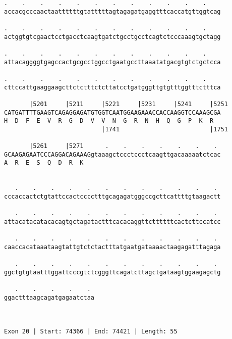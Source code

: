 \documentclass{article}
\begin{document}
\begin{Verbatim}
.    .    .    .    .    .    .    .    .    .    .    .    
accacgcccaactaattttttgtatttttagtagagatgaggtttcaccatgttggtcag
                                                            
.    .    .    .    .    .    .    .    .    .    .    .    
actggtgtcgaactcctgacctcaagtgatctgcctgcctcagtctcccaaagtgctagg
                                                            
.    .    .    .    .    .    .    .    .    .    .    .    
attacaggggtgagccactgcgcctggcctgaatgccttaaatatgacgtgtctgctcca
                                                            
.    .    .    .    .    .    .    .    .    .    .    .    
cttccattgaaggaagcttctctttctcttatcctgatgggttgtgtttggtttctttca
                                                            
       |5201     |5211     |5221     |5231     |5241     |5251
CATGATTTTGAAGTCAGAGGAGATGTGGTCAATGGAAGAAACCACCAAGGTCCAAAGCGA
H  D  F  E  V  R  G  D  V  V  N  G  R  N  H  Q  G  P  K  R  
                           |1741                         |1751
  
       |5261     |5271      .    .    .    .    .    .    . 
GCAAGAGAATCCCAGGACAGAAAGgtaaagctccctccctcaagttgacaaaaatctcac
A  R  E  S  Q  D  R  K                                      
                                                            
  
   .    .    .    .    .    .    .    .    .    .    .    . 
cccaccactctgtattccactcccctttgcagagatgggccgcttcattttgtaagactt
                                                            
   .    .    .    .    .    .    .    .    .    .    .    . 
attacatacatacacagtgctagatactttcacacaggttcttttttcactcttccatcc
                                                            
   .    .    .    .    .    .    .    .    .    .    .    . 
caaccacataaataagtattgtctctactttatgaatgataaaactaagagatttagaga
                                                            
   .    .    .    .    .    .    .    .    .    .    .    . 
ggctgtgtaatttggattcccgtctcgggttcagatcttagctgataagtggaagagctg
                                                            
   .    .    .    .    . 
ggactttaagcagatgagaatctaa
                         
                         
 
Exon 20 | Start: 74366 | End: 74421 | Length: 55




\end{Verbatim}
\end{document}
